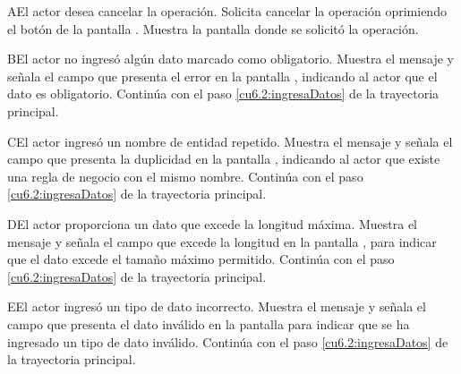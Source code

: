  \begin{UCtrayectoriaA}{A}{El actor desea cancelar la operación.}
    \UCpaso[\UCactor] Solicita cancelar la operación oprimiendo el botón  de la pantalla .
    \UCpaso[\UCsist] Muestra la pantalla donde se solicitó la operación.
 \end{UCtrayectoriaA} 
 \begin{UCtrayectoriaA}{B}{El actor no ingresó algún dato marcado como obligatorio.}
    \UCpaso[\UCsist] Muestra el mensaje  y señala el campo que presenta el error en la pantalla 
	    , indicando al actor que el dato es obligatorio.
    \UCpaso[] Continúa con el paso \ref{cu6.2:ingresaDatos} de la trayectoria principal.
 \end{UCtrayectoriaA}
 \begin{UCtrayectoriaA}{C}{El actor ingresó un nombre de entidad repetido.}
    \UCpaso[\UCsist] Muestra el mensaje  y señala el campo que presenta la duplicidad en la pantalla 
	    , indicando al actor que existe una regla de negocio con el mismo nombre.
    \UCpaso[] Continúa con el paso \ref{cu6.2:ingresaDatos} de la trayectoria principal.
 \end{UCtrayectoriaA}
 
 \begin{UCtrayectoriaA}{D}{El actor proporciona un dato que excede la longitud máxima.}
    \UCpaso[\UCsist] Muestra el mensaje  y señala el campo que excede la 
    longitud en la pantalla , para indicar que el dato excede el tamaño máximo permitido.
    \UCpaso[] Continúa con el paso \ref{cu6.2:ingresaDatos} de la trayectoria principal.
 \end{UCtrayectoriaA}
 
 \begin{UCtrayectoriaA}{E}{El actor ingresó un tipo de dato incorrecto.}
    \UCpaso[\UCsist] Muestra el mensaje  y señala el campo que presenta el dato inválido en la 
    pantalla  para indicar que se ha ingresado un tipo de dato inválido.
    \UCpaso[] Continúa con el paso \ref{cu6.2:ingresaDatos} de la trayectoria principal.
 \end{UCtrayectoriaA}

